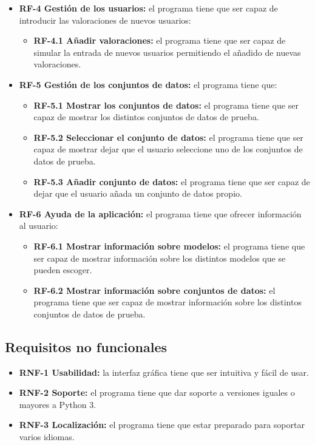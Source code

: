 \begin{itemize}
\item \textbf{RF-4 Gestión de los usuarios:} el programa tiene que ser capaz de introducir las valoraciones de nuevos usuarios:
\begin{itemize}
\tightlist
\item \textbf{RF-4.1 Añadir valoraciones:} el programa tiene que ser capaz de simular la entrada de nuevos usuarios permitiendo el añadido de nuevas valoraciones.
\end{itemize}
\item \textbf{RF-5 Gestión de los conjuntos de datos:} el programa tiene que:
\begin{itemize}
\tightlist
\item \textbf{RF-5.1 Mostrar los conjuntos de datos:} el programa tiene que ser capaz de mostrar los distintos conjuntos de datos de prueba.
\item \textbf{RF-5.2 Seleccionar el conjunto de datos:} el programa tiene que ser capaz de mostrar dejar que el usuario seleccione uno de los conjuntos de datos de prueba.
\item \textbf{RF-5.3 Añadir conjunto de datos:} el programa tiene que ser capaz de dejar que el usuario añada un conjunto de datos propio.
\end{itemize}
\item \textbf{RF-6 Ayuda de la aplicación:} el programa tiene que ofrecer información al usuario:
\begin{itemize}
\tightlist
\item \textbf{RF-6.1 Mostrar información sobre modelos:} el programa tiene que ser capaz de mostrar información sobre los distintos modelos que se pueden escoger.
\item \textbf{RF-6.2 Mostrar información sobre conjuntos de datos:} el programa tiene que ser capaz de mostrar información sobre los distintos conjuntos de datos de prueba.
\end{itemize}
\end{itemize}

\subsection{Requisitos no funcionales}
\begin{itemize}
\tightlist
\item \textbf{RNF-1 Usabilidad:} la interfaz gráfica tiene que ser intuitiva y fácil de usar.
\item \textbf{RNF-2 Soporte:} el programa tiene que dar soporte a versiones iguales o mayores a Python 3.
\item \textbf{RNF-3 Localización:} el programa tiene que estar preparado para soportar varios idiomas.
\end{itemize}


